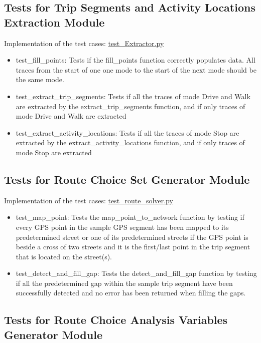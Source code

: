 \documentclass[12pt, titlepage]{article}
\begin{document}
\subsection{Tests for Trip Segments and Activity Locations Extraction Module}
Implementation of the test cases: \href{https://github.com/paezha/PyERT-BLACK/blob/rev1-implementation/test/test_Extractor.py}{test\_Extractor.py}
\begin{itemize}
    \item test\_fill\_points: Tests if the fill\_points function correctly populates data. All traces from the start of one one mode to the start of the next mode should be the same mode.

    \item test\_extract\_trip\_segments: Tests if all the traces of mode Drive and Walk are extracted by the extract\_trip\_segments function, and if only traces of mode Drive and Walk are extracted

    \item test\_extract\_activity\_locations: Tests if all the traces of mode Stop are extracted by the extract\_activity\_locations function, and if only traces of mode Stop are extracted

\end{itemize}

\subsection{Tests for Route Choice Set Generator Module}
Implementation of the test cases: \href{https://github.com/paezha/PyERT-BLACK/blob/rev1-implementation/test/test_route_solver.py}{test\_route\_solver.py}
\begin{itemize}
    \item test\_map\_point: Tests the map\_point\_to\_network function by testing if every GPS point in the sample GPS segment has been mapped to its predetermined street or one of its predetermined streets if the GPS point is beside a cross of two streets and it is the first/last point in the trip segment that is located on the street(s).

    \item test\_detect\_and\_fill\_gap: Tests the detect\_and\_fill\_gap function by testing if all the predetermined gap within the sample trip segment have been successfully detected and no error has been returned when filling the gaps.
\end{itemize}

\subsection{Tests for Route Choice Analysis Variables Generator Module}
\end{document}
